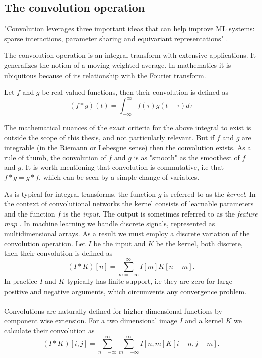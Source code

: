 \documentclass[../../thesis.tex]{subfiles}
\begin{document}
\subsection{The convolution operation}

"Convolution leverages three important ideas that can help improve ML systems: sparse interactions, parameter sharing and equivariant representations" \cite{deeplearningbook}.

The convolution operation is an integral transform with extensive applications. It generalizes the notion of a moving weighted average. In mathematics it is ubiquitous because of its relationship with the Fourier transform.\newline

Let $f$ and $g$ be real valued functions, then their convolution is defined as
\begin{equation}
    (f*g)(t) = \int_{-\infty}^{\infty} f(\tau)g(t-\tau) d\tau
\end{equation}

The mathematical nuances of the exact criteria for the above integral to exist is outside the scope of this thesis, and not particularly relevant. But if $f$ and $g$ are integrable (in the Riemann or Lebesgue sense) then the convolution exists. As a rule of thumb, the convolution of $f$ and $g$ is as "smooth" as the smoothest of $f$ and $g$. It is worth mentioning that convolution is commutative, i.e that $f*g = g*f$, which can be seen by a simple change of variables. \newline

As is typical for integral transforms, the function $g$ is referred to as the \textit{kernel}. In the context of convolutional networks the kernel consists of learnable parameters and the function $f$ is the \textit{input}. The output is sometimes referred to as the \textit{feature map} \cite{deeplearningbook}. In machine learning we handle discrete signals, represented as multidimensional arrays. As a result we must employ a discrete variation of the convolution operation. Let $I$ be the input and $K$ be the kernel, both discrete, then their convolution is defined as
\begin{equation}
    (I*K)[n] = \sum_{m=-\infty}^{\infty} I[m]K[n-m].
\end{equation}
In practice $I$ and $K$ typically has finite support, i.e they are zero for large positive and negative arguments, which circumvents any convergence problem.\\\\
Convolutions are naturally defined for higher dimensional functions by component wise extension. For a two dimensional image $I$ and a kernel $K$ we calculate their convolution as 
\begin{equation}
    (I*K)[i,j] = \sum_{n=-\infty}^{\infty}\sum_{m=-\infty}^{\infty} I[n,m]K[i - n,j - m]. 
\end{equation}
\end{document}
